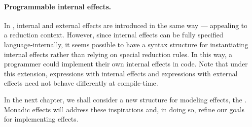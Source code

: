 \paragraph{Programmable internal effects.}
In \LangB, internal and external effects are introduced in the same way --- appealing to a reduction context.
However, since internal effects can be fully specified language-internally, it seems possible to have a syntax structure for instantiating internal effects rather than relying on special reduction rules.
In this way, a programmer could implement their own internal effects in code.
Note that under this extension, expressions with internal effects and expressions with external effects need not behave differently at compile-time.

\newparagraph
In the next chapter, we shall consider a new structure for modeling effects, the .
Monadic effects will address these inspirations and, in doing so, refine our goals for implementing effects.
